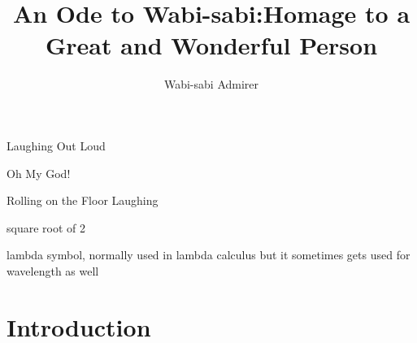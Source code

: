 \documentclass[dissertation, proposal]{bsu-cs}  %
\title{An Ode to Wabi-sabi:\titleBreak Homage to a Great and Wonderful Person}
\author{Wabi-sabi Admirer}
\begin{document}
\frontmatter  %

\buildFrontPages %

\begin{listAbbreviations}
  \item[LOL] Laughing Out Loud
  \item[OMG] Oh My God! 
  \item[ROFL] Rolling on the Floor Laughing
\end{listAbbreviations}


\begin{listSymbols}
  \item[$\sqrt{2}$] square root of 2
  \item[$\lambda$] lambda symbol, normally used in lambda calculus but
    it sometimes gets used for wavelength as well
\end{listSymbols}



\mainmatter


%
%

\chapter{Introduction}

%
%
\end{document}
